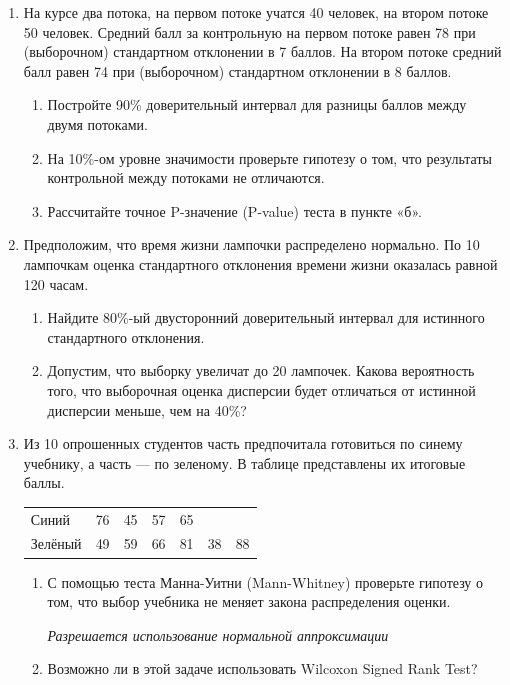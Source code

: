 \begin{enumerate}
\item На курсе два потока, на первом потоке учатся 40 человек, на втором
потоке 50 человек. Средний балл за контрольную на первом потоке
равен 78 при (выборочном) стандартном отклонении в 7 баллов. На
втором потоке средний балл равен 74 при (выборочном) стандартном
отклонении в 8 баллов.
\begin{enumerate}
\item Постройте 90\% доверительный интервал для разницы баллов между двумя потоками.
\item На 10\%-ом уровне значимости проверьте гипотезу о том, что результаты контрольной между потоками не отличаются.
\item Рассчитайте точное P-значение (P-value) теста в пункте «б».
\end{enumerate}

\item Предположим, что время жизни лампочки распределено нормально. По
10 лампочкам оценка стандартного отклонения времени жизни
оказалась равной 120 часам.
\begin{enumerate}
\item Найдите 80\%-ый двусторонний
доверительный интервал для истинного стандартного отклонения.
\item Допустим, что выборку увеличат до 20 лампочек. Какова
вероятность того, что выборочная оценка дисперсии будет отличаться
от истинной дисперсии меньше, чем на 40\%?
\end{enumerate}

\item Из 10 опрошенных студентов часть предпочитала готовиться по синему
учебнику, а часть — по зеленому. В таблице представлены их
итоговые баллы.

\begin{tabular}{@{}lcccccc@{}}
\toprule
Синий   & 76 & 45 & 57 & 65 &    &    \\
Зелёный & 49 & 59 & 66 & 81 & 38 & 88 \\ \bottomrule
\end{tabular}
\begin{enumerate}
\item С помощью теста Манна-Уитни (Mann-Whitney) проверьте
гипотезу о том, что выбор учебника не меняет закона распределения оценки.

\emph{Разрешается использование нормальной аппроксимации}

\item Возможно ли в этой задаче использовать Wilcoxon Signed Rank Test?
\end{enumerate}


\end{enumerate}

